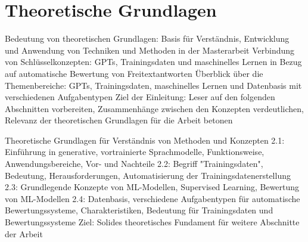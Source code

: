 \chapter{Theoretische Grundlagen}
\label{sec:related}

Bedeutung von theoretischen Grundlagen: Basis für Verständnis, Entwicklung und Anwendung von Techniken und Methoden in der Masterarbeit
Verbindung von Schlüsselkonzepten: GPTs, Trainingsdaten und maschinelles Lernen in Bezug auf automatische Bewertung von Freitextantworten
Überblick über die Themenbereiche: GPTs, Trainingsdaten, maschinelles Lernen und Datenbasis mit verschiedenen Aufgabentypen
Ziel der Einleitung: Leser auf den folgenden Abschnitten vorbereiten, Zusammenhänge zwischen den Konzepten verdeutlichen, Relevanz der theoretischen Grundlagen für die Arbeit betonen

Theoretische Grundlagen für Verständnis von Methoden und Konzepten
2.1: Einführung in generative, vortrainierte Sprachmodelle, Funktionsweise, Anwendungsbereiche, Vor- und Nachteile
2.2: Begriff "Trainingsdaten", Bedeutung, Herausforderungen, Automatisierung der Trainingsdatenerstellung
2.3: Grundlegende Konzepte von ML-Modellen, Supervised Learning, Bewertung von ML-Modellen
2.4: Datenbasis, verschiedene Aufgabentypen für automatische Bewertungssysteme, Charakteristiken, Bedeutung für Trainingsdaten und Bewertungssysteme
Ziel: Solides theoretisches Fundament für weitere Abschnitte der Arbeit




